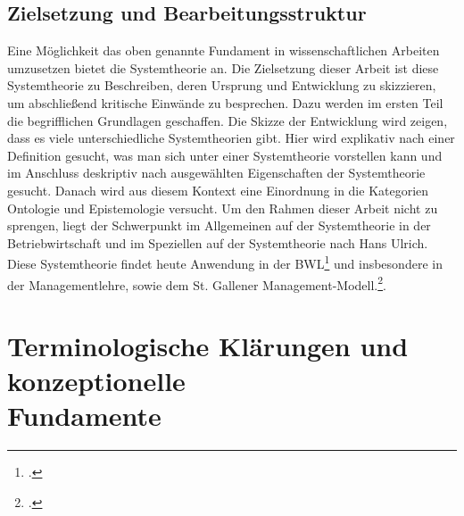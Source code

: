 \documentclass[a4paper,12pt]{article}
\begin{document}
\subsection{Zielsetzung und Bearbeitungsstruktur}
Eine Möglichkeit das oben genannte Fundament in wissenschaftlichen Arbeiten umzusetzen bietet die Systemtheorie an. Die Zielsetzung dieser Arbeit ist diese Systemtheorie zu Beschreiben, deren Ursprung und Entwicklung zu skizzieren, um abschließend kritische Einwände zu besprechen. Dazu werden im ersten Teil die begrifflichen Grundlagen geschaffen. Die Skizze der Entwicklung wird zeigen, dass es viele unterschiedliche Systemtheorien gibt. Hier wird explikativ nach einer Definition gesucht, was man sich unter einer Systemtheorie vorstellen kann und im Anschluss deskriptiv nach ausgewählten Eigenschaften der Systemtheorie gesucht. Danach wird aus diesem Kontext eine Einordnung in die Kategorien Ontologie und Epistemologie versucht. Um den Rahmen dieser Arbeit nicht zu sprengen, liegt der Schwerpunkt im Allgemeinen auf der Systemtheorie in der Betriebwirtschaft und im Speziellen auf der Systemtheorie nach Hans Ulrich. Diese Systemtheorie findet heute Anwendung in der BWL\footcite[S. 26]{Woehe2008} und insbesondere in der Managementlehre, sowie dem St. Gallener Management-Modell.\footcite[S. 10]{RueeggStuerm2020}.



\section{Terminologische Klärungen und konzeptionelle\\ Fundamente}
\end{document}
